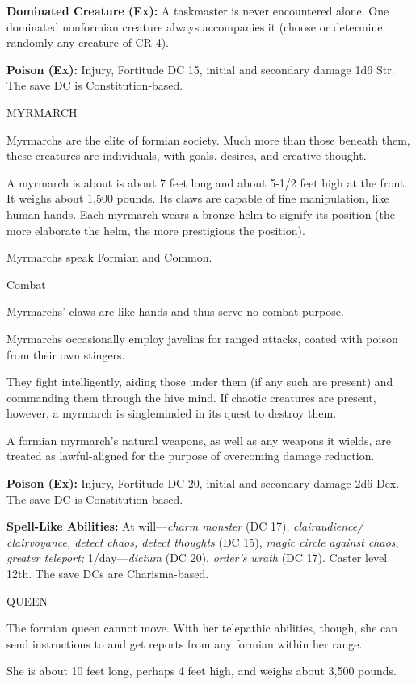 \documentclass{article}
\begin{document}
\textbf{Dominated Creature (Ex):} A taskmaster is never encountered alone. One 
dominated nonformian creature always accompanies it (choose or determine randomly 
any creature of CR 4). 

\textbf{Poison (Ex):} Injury, Fortitude DC 15, initial and secondary damage 1d6 
Str. The save DC is Constitution-based.

MYRMARCH

Myrmarchs are the elite of formian society. Much more than those beneath them, 
these creatures are individuals, with goals, desires, and creative thought. 

A myrmarch is about is about 7 feet long and about 5-1/2 feet high at the front. 
It weighs about 1,500 pounds. Its claws are capable of fine manipulation, like 
human hands. Each myrmarch wears a bronze helm to signify its position (the more 
elaborate the helm, the more prestigious the position).

Myrmarchs speak Formian and Common.

Combat

Myrmarchs' claws are like hands and thus serve no combat purpose.

Myrmarchs occasionally employ javelins for ranged attacks, coated with poison from 
their own stingers.

They fight intelligently, aiding those under them (if any such are present) and 
commanding them through the hive mind. If chaotic creatures are present, however, 
a myrmarch is singleminded in its quest to destroy them.

A formian myrmarch's natural weapons, as well as any weapons it wields, are treated 
as lawful-aligned for the purpose of overcoming damage reduction.

\textbf{Poison (Ex):} Injury, Fortitude DC 20, initial and secondary damage 2d6 
Dex. The save DC is Constitution-based.

\textbf{Spell-Like Abilities:} At will---\textit{charm monster }(DC 17), \textit{clairaudience/ 
clairvoyance, detect chaos, detect thoughts }(DC 15), \textit{magic circle against 
chaos}, \textit{greater teleport; }1/day---\textit{dictum }(DC 20), \textit{order's 
wrath }(DC 17). Caster level 12th. The save DCs are Charisma-based.

QUEEN

The formian queen cannot move. With her telepathic abilities, though, she can send 
instructions to and get reports from any formian within her range. 

She is about 10 feet long, perhaps 4 feet high, and weighs about 3,500 pounds.
\end{document}
